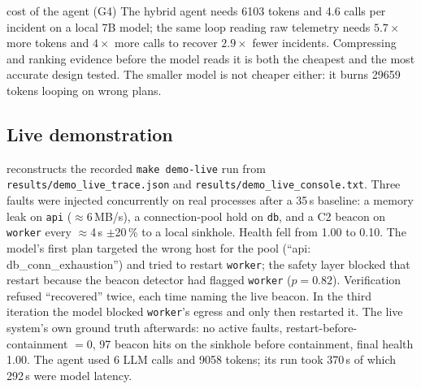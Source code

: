 \documentclass[11pt,a4paper]{article}
\newcommand{\code}[1]{\texttt{#1}}
\newcommand{\pct}[1]{#1\,\%}
\begin{document}
\begin{keyfinding}{cost of the agent (G4)}
The hybrid agent needs \num{6103} tokens and 4.6 calls per incident on a local 7B model; the same
loop reading raw telemetry needs $5.7\times$ more tokens and $4\times$ more calls to recover
$2.9\times$ fewer incidents. Compressing and ranking evidence before the model reads it is both the
cheapest and the most accurate design tested. The smaller model is not cheaper either: it burns
\num{29659} tokens looping on wrong plans.
\end{keyfinding}

\subsection{Live demonstration}
 reconstructs the recorded \code{make demo-live} run from
\code{results/demo\_live\_trace.json} and \code{results/demo\_live\_console.txt}. Three faults were
injected concurrently on real processes after a 35\,s baseline: a memory leak on \code{api}
($\approx$6\,MB/s), a connection-pool hold on \code{db}, and a C2 beacon on \code{worker} every
$\approx$4\,s $\pm$\pct{20} to a local sinkhole. Health fell from 1.00 to 0.10. The model's first
plan targeted the wrong host for the pool (``api: db\_conn\_exhaustion'') and tried to restart
\code{worker}; the safety layer blocked that restart because the beacon detector had flagged
\code{worker} ($p=0.82$). Verification refused ``recovered'' twice, each time naming the live beacon.
In the third iteration the model blocked \code{worker}'s egress and only then restarted it. The live
system's own ground truth afterwards: no active faults, restart-before-containment $=0$, 97 beacon
hits on the sinkhole before containment, final health 1.00. The agent used 6 LLM calls and
\num{9058} tokens; its run took 370\,s of which 292\,s were model latency.
\end{document}

